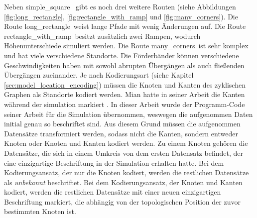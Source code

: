 \newpage
Neben \glqq simple\_square \grqq\ gibt es noch drei weitere Routen (siehe Abbildungen \ref{fig:long_rectangle}, \ref{fig:rectangle_with_ramp} und \ref{fig:many_corners}).
Die Route \glqq long\_rectangle\grqq\ weist lange Pfade mit wenig Änderungen auf.
Die Route \glqq rectangle\_with\_ramp\grqq\ besitzt zusätzlich zwei Rampen, wodurch Höhenunterschiede simuliert werden.
Die Route \glqq many\_corners\grqq\ ist sehr komplex und hat viele verschiedene Standorte.
Die Förderbänder können verschiedene Geschwindigkeiten haben mit sowohl abrupten Übergängen als auch fließenden Übergängen zueinander.
\newline
\newline
Je nach Kodierungsart (siehe Kapitel \ref{sec:model_location_encoding}) müssen die Knoten und Kanten des zyklischen Graphen als Standorte kodiert werden.
Mian hatte in seiner Arbeit die Kanten während der simulation markiert \cite{naveedThesis}.
In dieser Arbeit wurde der Programm-Code seiner Arbeit für die Simulation übernommen, weswegen die aufgenommen Daten initial genau so beschriftet sind.
Aus diesem Grund müssen die aufgenommen Datensätze transformiert werden, sodass nicht die Kanten, sondern entweder Knoten oder Knoten und Kanten kodiert werden.
Zu einem Knoten gehören die Datensätze, die sich in einem Umkreis von dem ersten Datensatz befindet, der eine einzigartige Beschriftung in der Simulation erhalten hatte.
Bei dem Kodierungsansatz, der nur die Knoten kodiert, werden die restlichen Datensätze als \textit{unbekannt} beschriftet.
Bei dem Kodierungsansatz, der Knoten und Kanten kodiert, werden die restlichen Datensätze mit einer neuen einzigartigen Beschriftung markiert, die abhängig von der
topologischen Position der zuvor bestimmten Knoten ist.
